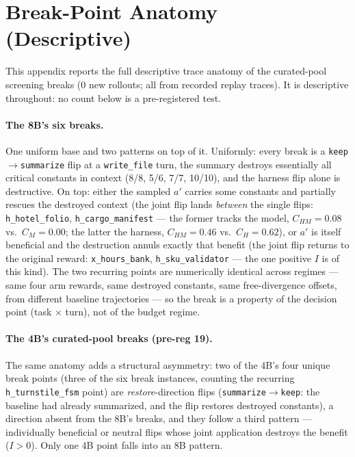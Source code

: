 \documentclass{article}
\theoremstyle{remark}
\begin{document}
\section{Break-Point Anatomy (Descriptive)}
\label{app:anatomy}
This appendix reports the full descriptive trace anatomy of the curated-pool
screening breaks (0 new rollouts; all from recorded replay traces). It is
descriptive throughout: no count below is a pre-registered test.

\paragraph{The 8B's six breaks.} One uniform base and two patterns on top of
it. Uniformly: every break is a \texttt{keep}$\to$\texttt{summarize} flip at
a \texttt{write\_file} turn, the summary destroys essentially all critical
constants in context (8/8, 5/6, 7/7, 10/10), and the harness flip alone is
destructive. On top: either the sampled $a'$ carries some constants and
partially rescues the destroyed context (the joint flip lands \emph{between}
the single flips: \texttt{h\_hotel\_folio}, \texttt{h\_cargo\_manifest} ---
the former tracks the model, $C_{HM}=0.08$ vs.\ $C_M=0.00$; the latter the
harness, $C_{HM}=0.46$ vs.\ $C_H=0.62$), or $a'$ is itself beneficial and
the destruction annuls exactly that benefit (the joint flip returns to the
original reward: \texttt{x\_hours\_bank}, \texttt{h\_sku\_validator} ---
the one positive $I$ is of this kind). The two recurring points are
numerically identical across regimes --- same four arm rewards, same
destroyed constants, same free-divergence offsets, from different baseline
trajectories --- so the break is a property of the decision point (task
$\times$ turn), not of the budget regime.

\paragraph{The 4B's curated-pool breaks (pre-reg 19).} The same anatomy adds a structural
asymmetry: two of the 4B's four unique break points (three of the six break
instances, counting the recurring \texttt{h\_turnstile\_fsm} point) are
\emph{restore}-direction flips (\texttt{summarize}$\to$\texttt{keep}: the
baseline had already summarized, and the flip restores destroyed constants),
a direction absent from the 8B's breaks, and they follow a third pattern ---
individually beneficial or neutral flips whose joint application destroys
the benefit ($I>0$). Only one 4B point falls into an 8B pattern.
\end{document}
